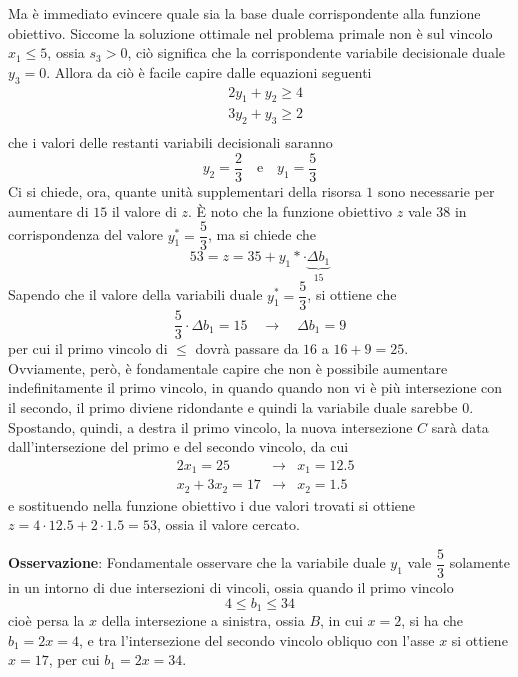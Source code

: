 \documentclass[a4paper]{extarticle}
\begin{document}
\vspace{1em}
\noindent
Ma è immediato evincere quale sia la base duale corrispondente alla funzione obiettivo. Siccome la soluzione ottimale nel problema primale non è sul vincolo $x_1 \leq 5$, ossia $s_3 > 0$, ciò significa che la corrispondente variabile decisionale duale $y_3=0$. Allora da ciò è facile capire dalle equazioni seguenti
\begin{align*}
    & 2y_1 +y_2 \geq 4\\
    & 3y_2 + y_3 \geq 2\\
\end{align*}
che i valori delle restanti variabili decisionali saranno
\[y_2 = \dfrac{2}{3} \hspace{1em} \text{e} \hspace{1em} y_1 = \dfrac{5}{3}\]
Ci si chiede, ora, quante unità supplementari della risorsa $1$ sono necessarie per aumentare di $15$ il valore di $z$. È noto che la funzione obiettivo $z$ vale $38$ in corrispondenza del valore $y_1^*=\dfrac{5}{3}$, ma si chiede che
\[53 = z = 35 + y_1* \cdot \underbrace{\Delta b_1}_{15}\]
Sapendo che il valore della variabili duale $y_1^*=\dfrac{5}{3}$, si ottiene che 
\[\dfrac{5}{3} \cdot \Delta b_1 = 15 \hspace{1em} \rightarrow \hspace{1em} \Delta b_1 = 9\]
per cui il primo vincolo di $\leq$ dovrà passare da $16$ a $16+9=25$.\\
Ovviamente, però, è fondamentale capire che non è possibile aumentare indefinitamente il primo vincolo, in quando quando non vi è più intersezione con il secondo, il primo diviene ridondante e quindi la variabile duale sarebbe $0$.\\
Spostando, quindi, a destra il primo vincolo, la nuova intersezione $C$ sarà data dall'intersezione del primo e del secondo vincolo, da cui
\begin{align*}
    &2x_1 = 25 & \rightarrow & x_1 = 12.5\\
    &x_2+3x_2 = 17 & \rightarrow & x_2 = 1.5
\end{align*}
e sostituendo nella funzione obiettivo i due valori trovati si ottiene $z= 4 \cdot 12.5 + 2 \cdot 1.5 = 53$, ossia il valore cercato.

\vspace{1em}
\noindent
\textbf{Osservazione}: Fondamentale osservare che la variabile duale $y_1$ vale $\dfrac{5}{3}$ solamente in un intorno di due intersezioni di vincoli, ossia quando il primo vincolo
\[4 \leq b_1 \leq 34\]
cioè persa la $x$ della intersezione a sinistra, ossia $B$, in cui $x=2$, si ha che $b_1=2x=4$, e tra l'intersezione del secondo vincolo obliquo con l'asse $x$ si ottiene $x=17$, per cui $b_1=2x=34$.
\end{document}
